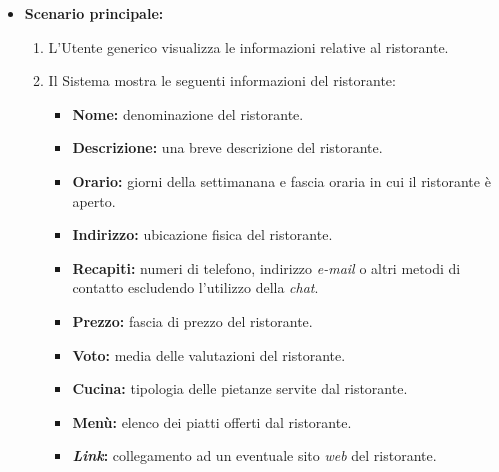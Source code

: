 \begin{itemize}
	\item \textbf{Scenario principale:}
		\begin{enumerate}
		    \item L'Utente generico visualizza le informazioni relative al ristorante.
		    \item Il Sistema mostra le seguenti informazioni del ristorante:
		    \begin{itemize}
				\item \textbf{Nome:} denominazione del ristorante.
				\item \textbf{Descrizione:} una breve descrizione del ristorante.
				\item \textbf{Orario:} giorni della settimanana e fascia oraria in cui il ristorante è aperto.
				\item \textbf{Indirizzo:} ubicazione fisica del ristorante.
				\item \textbf{Recapiti:} numeri di telefono, indirizzo \textit{e-mail} o altri metodi di contatto escludendo l'utilizzo della \textit{chat}.
				\item \textbf{Prezzo:} fascia di prezzo del ristorante.
				\item \textbf{Voto:} media delle valutazioni del ristorante.
				\item \textbf{Cucina:} tipologia delle pietanze servite dal ristorante.
				\item \textbf{Menù:} elenco dei piatti offerti dal ristorante.
				\item \textbf{\textit{Link}:} collegamento ad un eventuale sito \textit{web} del ristorante. 
			\end{itemize}
	    \end{enumerate}

\end{itemize}
